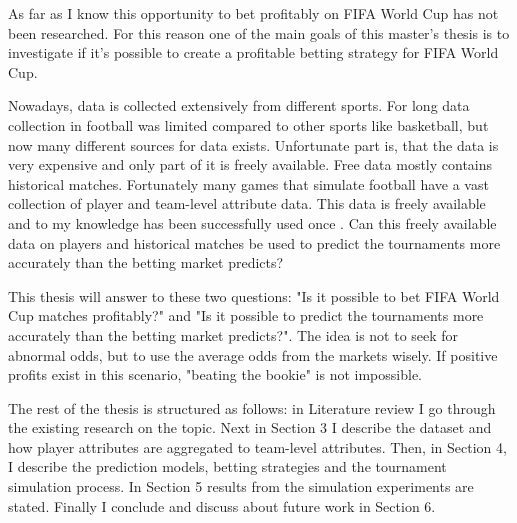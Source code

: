 As far as I know this opportunity to bet profitably on FIFA World Cup has not been researched. For this reason one of the main goals of this master's thesis is to investigate if it's possible to create a profitable betting strategy for FIFA World Cup.

Nowadays, data is collected extensively from different sports. For long data collection in football was limited compared to other sports like basketball, but now many different sources for data exists. Unfortunate part is, that the data is very expensive and only part of it is freely available. Free data mostly contains historical matches. Fortunately many games that simulate football have a vast collection of player and team-level attribute data. This data is freely available and to my knowledge has been successfully used once \cite{shin2014novel}. Can this freely available data on players and historical matches be used to predict the tournaments more accurately than the betting market predicts?

This thesis will answer to these two questions: "Is it possible to bet FIFA World Cup matches profitably?" and "Is it possible to predict the tournaments more accurately than the betting market predicts?". The idea is not to seek for abnormal odds, but to use the average odds from the markets wisely. If positive profits exist in this scenario, "beating the bookie" is not impossible.

The rest of the thesis is structured as follows: in Literature review I go through the existing research on the topic. Next in Section 3 I describe the dataset and how player attributes are aggregated to team-level attributes. Then, in Section 4, I describe the prediction models, betting strategies and the tournament simulation process. In Section 5 results from the simulation experiments are stated. Finally I conclude and discuss about future work in Section 6.